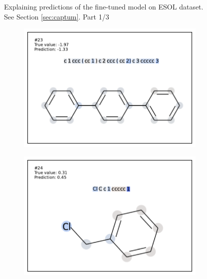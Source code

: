 \begin{figure}
\caption{Explaining predictions of the fine-tuned model on ESOL dataset. See Section \ref{sec:captum}. Part 1/3}
\label{fig:captum-esol-1}
\end{figure}




\begin{figure}
\centering

\begin{subfigure}[b]{0.33\textwidth} 
  \centering 
  \includegraphics[width=\textwidth]{figures/esol/esol23.pdf} 
\end{subfigure}\begin{subfigure}[b]{0.33\textwidth} 
  \centering 
  \includegraphics[width=\textwidth]{figures/esol/esol24.pdf} 
\end{subfigure}\begin{subfigure}[b]{0.33\textwidth} 

\end{subfigure}
\end{figure}
